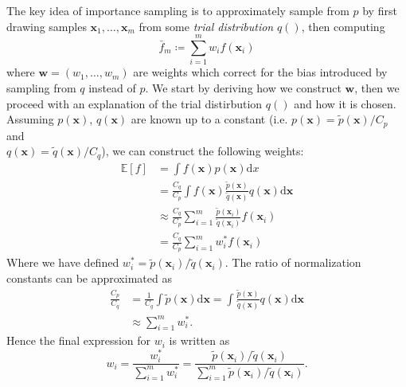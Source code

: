 \documentclass[12pt,a4paper]{article}
\newcommand{\x}{\boldsymbol{x}}
\newcommand{\np}{\vskip 5mm}
\begin{document}
The key idea of importance sampling is to approximately sample from $p$ by first drawing samples $\x_1, \ldots, \x_m$ from some \textit{trial distribution} $q()$, then computing
\begin{equation}
\bar{f}_m \coloneqq \sum_{i = 1}^m w_i f(\x_i)
\end{equation}
where $\boldsymbol{w} = (w_1, \ldots, w_m)$ are weights which correct for the bias introduced by sampling from $q$ instead of $p$. We start by deriving how we construct $\boldsymbol{w}$, then we proceed with an explanation of the trial distirbution $q()$ and how it is chosen.
\np
Assuming $p(\x)$, $q(\x)$ are known up to a constant (i.e. $p(\x) = \tilde{p}(\x) / C_p $ and \\ $q(\x) = \tilde{q}(\x) / C_q$), we can construct the following weights:
\begin{equation}
\begin{split}
\mathbb{E}[f] &= \int f(\x) p(\x) \text{d}x \\
&= \frac{C_q}{C_p} \int f(\x) \frac{\tilde{p}(\x)}{\tilde{q}(\x)} q(\x) \text{d}\x \\
&\approx \frac{C_q}{C_p} \sum_{i = 1}^m \frac{\tilde{p}(\x_i)}{\tilde{q}(\x_i)} f(\x_i) \\
&= \frac{C_q}{C_p} \sum_{i = 1}^m w^*_i f(\x_i)
\end{split}
\end{equation}
Where we have defined $w^*_i =\tilde{p}(\x_i) / \tilde{q}(\x_i)$. The ratio of normalization constants can be approximated as
\begin{equation}
\begin{split}
\frac{C_p}{C_q} &= \frac{1}{C_q} \int \tilde{p}(\x) \text{d}\x = \int \frac{\tilde{p}(\x)}{\tilde{q}(\x)} q(\x) \text{d}\x \\
&\approx \sum_{i = 1}^m w_i^*.
\end{split}
\end{equation}
Hence the final expression for $w_i$ is written as
\begin{equation}
w_i = \frac{w^*_i}{\sum_{i = 1}^m w^*_i} = \frac{\tilde{p}(\x_i) / \tilde{q}(\x_i)}{\sum_{i = 1}^m \tilde{p}(\x_i) / \tilde{q}(\x_i)}.
\end{equation}


\printbibliography
\end{document}
